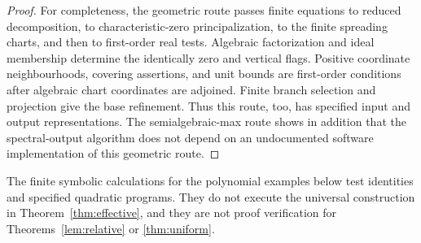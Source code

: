 \begin{proof}
For completeness, the geometric route passes finite equations to
reduced decomposition, to characteristic-zero principalization, to the
finite spreading charts, and then to first-order real tests. Algebraic
factorization and ideal membership determine the identically zero and
vertical flags. Positive coordinate neighbourhoods, covering assertions,
and unit bounds are first-order conditions after algebraic chart
coordinates are adjoined. Finite branch selection and projection give
the base refinement. Thus this route, too, has specified input and output
representations. The semialgebraic-max route shows in addition that the
spectral-output algorithm does not depend on an undocumented software
implementation of this geometric route.
\end{proof}

The finite symbolic calculations for the polynomial examples below test
identities and specified quadratic programs. They do not execute the
universal construction in Theorem~\ref{thm:effective}, and they are not
proof verification for Theorems~\ref{lem:relative} or \ref{thm:uniform}.
